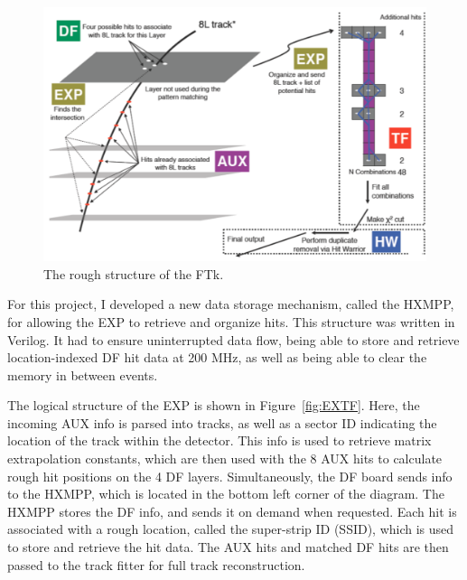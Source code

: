 \begin{figure}[htbp]
    \centering
    \includegraphics[width=\linewidth]{Images/Other/FTk_layout.png}
    \caption{The rough structure of the FTk.}
    \label{fig:FTk_layout}
\end{figure}

For this project, I developed a new data storage mechanism, called the HXMPP, for allowing the EXP to retrieve and organize hits. This structure was written in Verilog. It had to ensure uninterrupted data flow, being able to store and retrieve location-indexed DF hit data at 200 MHz, as well as being able to clear the memory in between events.

The logical structure of the EXP is shown in Figure~\ref{fig:EXTF}. Here, the incoming AUX info is parsed into tracks, as well as a sector ID indicating the location of the track within the detector. This info is used to retrieve matrix extrapolation constants, which are then used with the 8 AUX hits to calculate rough hit positions on the 4 DF layers. Simultaneously, the DF board sends info to the HXMPP, which is located in the bottom left corner of the diagram. The HXMPP stores the DF info, and sends it on demand when requested. Each hit is associated with a rough location, called the super-strip ID (SSID), which is used to store and retrieve the hit data. The AUX hits and matched DF hits are then passed to the track fitter for full track reconstruction.

